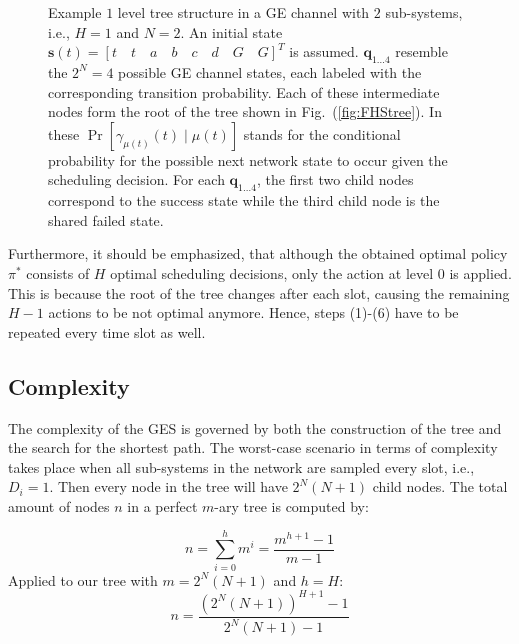 \begin{sidewaysfigure}
	\centering
   
  \caption[Example tree structure for GES with 2 sub-systems and Finite Horizon
  1]{Example $1$ level tree structure in a GE channel with $2$ sub-systems,
  i.e., $H=1$ and $N=2$. An initial state $\boldsymbol{s}(t)=\left[t\quad t\quad
  a\quad b\quad c\quad d\quad G\quad G \right]^T$ is assumed. $\boldsymbol{q}_
  {1\dots 4}$ resemble the $2^N=4$ possible GE channel states, each labeled with
  the corresponding transition probability. Each of these intermediate nodes
  form the root of the tree shown in Fig.~(\ref{fig:FHStree}). In these
  $\Pr[\gamma_{\mu(t)}(t)\mid \mu(t)]$ stands for the conditional probability
  for the possible next network state to occur given the scheduling decision.
  For each $\boldsymbol{q}_{1\dots 4}$, the first two child nodes correspond to
  the success state while the third child node is the shared failed state.}
	\label{fig:GEStree}
\end{sidewaysfigure}

Furthermore, it should be emphasized, that although the obtained optimal policy
$\pi^*$ consists of $H$ optimal scheduling decisions, only the action at level 0
is applied. This is because the root of the tree changes after each slot,
causing the remaining $H-1$ actions to be not optimal anymore. Hence, steps
(1)-(6) have to be repeated every time slot as well. 

\subsection{Complexity}

The complexity of the GES is governed by both the construction of the tree and
the search for the shortest path. The worst-case scenario in terms of complexity
takes place when all sub-systems in the network are sampled every slot, i.e.,
$D_i=1$. Then every node in the tree will have $2^N(N+1)$ child nodes. The total
amount of nodes $n$ in a perfect $m$-ary tree is computed by:

\begin{equation}
  n = \sum_{i=0}^{h}m^i = \frac{m^{h+1}-1}{m-1}
\end{equation}
Applied to our tree with $m=2^N(N+1)$ and $h=H$: 
\begin{equation}
  n = \frac{(2^N(N+1))^{H+1}-1}{2^N(N+1)-1} 
\end{equation} 

